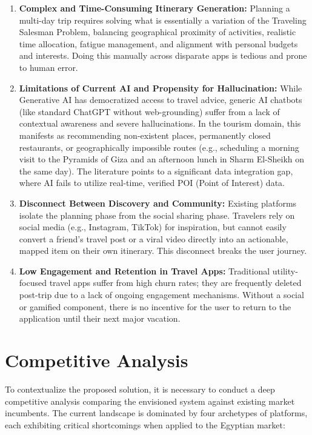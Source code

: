 \begin{enumerate}
    \item \textbf{Complex and Time-Consuming Itinerary Generation:} Planning a multi-day trip requires solving what is essentially a variation of the Traveling Salesman Problem, balancing geographical proximity of activities, realistic time allocation, fatigue management, and alignment with personal budgets and interests. Doing this manually across disparate apps is tedious and prone to human error.
    
    \item \textbf{Limitations of Current AI and Propensity for Hallucination:} While Generative AI has democratized access to travel advice, generic AI chatbots (like standard ChatGPT without web-grounding) suffer from a lack of contextual awareness and severe hallucinations. In the tourism domain, this manifests as recommending non-existent places, permanently closed restaurants, or geographically impossible routes (e.g., scheduling a morning visit to the Pyramids of Giza and an afternoon lunch in Sharm El-Sheikh on the same day). The literature points to a significant data integration gap, where AI fails to utilize real-time, verified POI (Point of Interest) data.
    
    \item \textbf{Disconnect Between Discovery and Community:} Existing platforms isolate the planning phase from the social sharing phase. Travelers rely on social media (e.g., Instagram, TikTok) for inspiration, but cannot easily convert a friend's travel post or a viral video directly into an actionable, mapped item on their own itinerary. This disconnect breaks the user journey.
    
    \item \textbf{Low Engagement and Retention in Travel Apps:} Traditional utility-focused travel apps suffer from high churn rates; they are frequently deleted post-trip due to a lack of ongoing engagement mechanisms. Without a social or gamified component, there is no incentive for the user to return to the application until their next major vacation.
\end{enumerate}

\section{Competitive Analysis}
To contextualize the proposed solution, it is necessary to conduct a deep competitive analysis comparing the envisioned system against existing market incumbents. The current landscape is dominated by four archetypes of platforms, each exhibiting critical shortcomings when applied to the Egyptian market:

